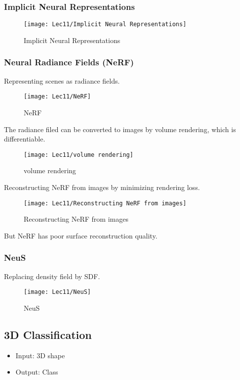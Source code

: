 \subsubsection{Implicit Neural Representations}
\begin{figure}[H]
    \centering
    \texttt{[image: Lec11/Implicit Neural Representations]}
    \caption{Implicit Neural Representations}
\end{figure}

\subsubsection{Neural Radiance Fields (NeRF)}

Representing scenes as radiance fields. 
\begin{figure}[H]
    \centering
    \texttt{[image: Lec11/NeRF]}
    \caption{NeRF}
\end{figure}

The radiance filed can be converted to images by volume rendering, which is differentiable. 
\begin{figure}[H]
    \centering
    \texttt{[image: Lec11/volume rendering]}
    \caption{volume rendering}
\end{figure}

Reconstructing NeRF from images by minimizing rendering loss. 
\begin{figure}[H]
    \centering
    \texttt{[image: Lec11/Reconstructing NeRF from images]}
    \caption{Reconstructing NeRF from images}
\end{figure}

But NeRF has poor surface reconstruction quality. 

\quad

\quad

\subsubsection{NeuS}

Replacing density field by SDF. 
\begin{figure}[H]
    \centering
    \texttt{[image: Lec11/NeuS]}
    \caption{NeuS}
\end{figure}

\subsection{3D Classification}
\begin{itemize}
    \item Input: 3D shape
    \item Output: Class
\end{itemize}

